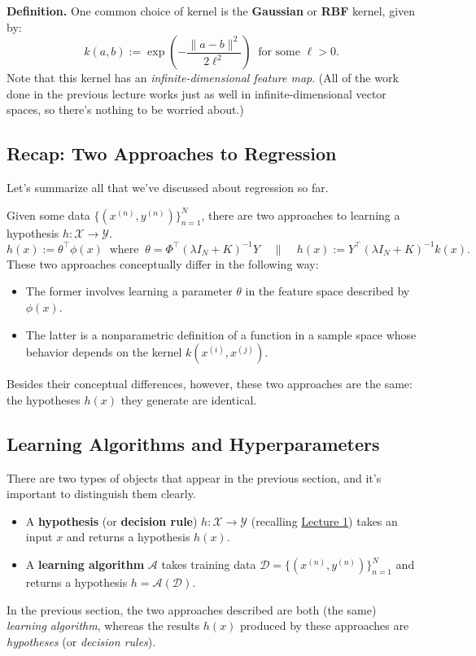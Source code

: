 \textbf{Definition.}
One common choice of kernel is the
\textbf{Gaussian} or \textbf{RBF} kernel, given by:
\[ k(a, b) := \exp\left(
    -\frac{\|a - b\|^2}{2\ell^2}
\right) ~ \text{ for some } \ell > 0. \]
Note that this kernel has an
\emph{infinite-dimensional feature map}.
(All of the work done in the previous lecture
works just as well in infinite-dimensional vector spaces,
so there's nothing to be worried about.)

\subsection{Recap: Two Approaches to Regression}

Let's summarize all that we've discussed about regression so far.

Given some data $\{(x^{(n)}, y^{(n)})\}_{n = 1}^N$,
there are two approaches to learning a hypothesis
$h \colon \mathcal{X} \to \mathcal{Y}$.
\[
    h(x) := \theta^{\top}\phi(x)
    ~ \text{ where } ~
    \theta = \Phi^{\top}(\lambda I_N + K)^{-1}Y
    ~~~~~ \parallel ~~~~~
    h(x) := Y^{\top}(\lambda I_N + K)^{-1}k(x).
\]
These two approaches conceptually differ in the following way:
\begin{itemize}
    \item The former involves learning a parameter $\theta$
    in the feature space described by $\phi(x)$.
    \item The latter is a nonparametric definition of
    a function in a sample space whose behavior
    depends on the kernel $k(x^{(i)}, x^{(j)})$.
\end{itemize}
Besides their conceptual differences, however,
these two approaches are the same:
the hypotheses $h(x)$ they generate are identical.

\subsection{Learning Algorithms and Hyperparameters}

There are two types of objects
that appear in the previous section,
and it's important to distinguish them clearly.
\begin{itemize}
    \item A \textbf{hypothesis} (or \textbf{decision rule})
    $h \colon \mathcal{X} \to \mathcal{Y}$
    (recalling \href{/6.790/lectures/1/#setting-up}{Lecture 1})
    takes an input $x$ and returns a hypothesis $h(x)$.
    \item A \textbf{learning algorithm} $\mathcal{A}$
    takes training data $\mathcal{D} = \{(x^{(n)}, y^{(n)})\}_{n = 1}^N$
    and returns a hypothesis $h = \mathcal{A}(\mathcal{D})$.
\end{itemize}
In the previous section,
the two approaches described are both
(the same) \emph{learning algorithm},
whereas the results $h(x)$ produced by these approaches
are \emph{hypotheses} (or \emph{decision rules}).

